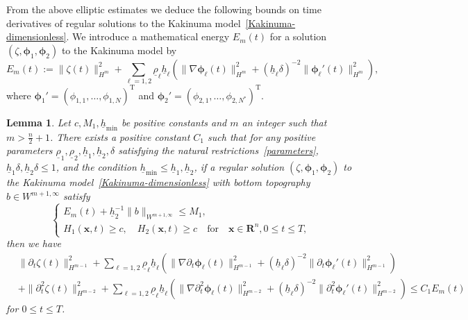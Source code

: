 \documentclass[11pt,leqno]{article}
\newtheorem{lemma}[theorem]{\bf Lemma}
\numberwithin{equation}{section}
\numberwithin{figure}{section}
\begin{document}
From the above elliptic estimates we deduce the following bounds on time derivatives of regular solutions to the Kakinuma model~\eqref{Kakinuma-dimensionless}. 
We introduce a mathematical energy $E_m(t)$ for a solution $(\zeta,\bm{\phi}_1,\bm{\phi}_2)$ to the Kakinuma model by 
%
\begin{equation}\label{MathematicalEnergy}
E_m(t) := \|\zeta(t)\|_{H^m}^2 + \sum_{\ell=1,2}\underline{\rho}_\ell\underline{h}_\ell
 ( \|\nabla\bm{\phi}_\ell(t)\|_{H^m}^2 + (\underline{h}_\ell\delta)^{-2}\|\bm{\phi}_\ell'(t)\|_{H^m}^2 ),
\end{equation}
%
where $\bm{\phi}_1'=(\phi_{1,1},\ldots,\phi_{1,N})^\mathrm{T}$ and $\bm{\phi}_2'=(\phi_{2,1},\ldots,\phi_{2,N^*})^\mathrm{T}$. 


\begin{lemma}\label{L.time-derivatives-and-elliptic}
Let $c, M_1, \underline{h}_\mathrm{min}$ be positive constants and $m$ an integer such that $m>\frac{n}{2}+1$. 
There exists a positive constant $C_1$ such that for any positive parameters 
$\underline{\rho}_1, \underline{\rho}_2, \underline{h}_1, \underline{h}_2, \delta$ satisfying the natural 
restrictions~\eqref{parameters}, $\underline{h}_1\delta, \underline{h}_2\delta \leq 1$, and the condition 
$\underline{h}_\mathrm{min} \leq \underline{h}_1,\underline{h}_2$, 
if a regular solution $(\zeta,\bm{\phi}_1,\bm{\phi}_2)$ to the Kakinuma model~\eqref{Kakinuma-dimensionless} with bottom topography $b\in W^{m+1,\infty}$ satisfy 
%
\[
\begin{cases}
 E_m(t) + \underline{h}_2^{-1}\|b\|_{W^{m+1,\infty}} \leq M_1, \\
 H_1(\bm{x},t) \geq c, \quad H_2(\bm{x},t) \geq c
  \quad\mbox{for}\quad \bm{x}\in\mathbf{R}^n, 0\leq t\leq T,
\end{cases}
\]
%
then we have 
%
\begin{align}\label{estimate-time-derivatives}
& \|\partial_t\zeta(t)\|_{H^{m-1}}^2 + \sum_{\ell=1,2}\underline{\rho}_\ell\underline{h}_\ell
 ( \|\nabla\partial_t\bm{\phi}_\ell(t)\|_{H^{m-1}}^2
   + (\underline{h}_\ell\delta)^{-2}\|\partial_t\bm{\phi}_\ell'(t)\|_{H^{m-1}}^2 ) \\
& + \|\partial_t^2\zeta(t)\|_{H^{m-2}}^2 + \sum_{\ell=1,2}\underline{\rho}_\ell\underline{h}_\ell
 ( \|\nabla\partial_t^2\bm{\phi}_\ell(t)\|_{H^{m-2}}^2
   + (\underline{h}_\ell\delta)^{-2}\|\partial_t^2\bm{\phi}_\ell'(t)\|_{H^{m-2}}^2 )
 \leq C_1E_m(t) \nonumber
\end{align}
%
for $0\leq t\leq T$. 
\end{lemma}
\end{document}
